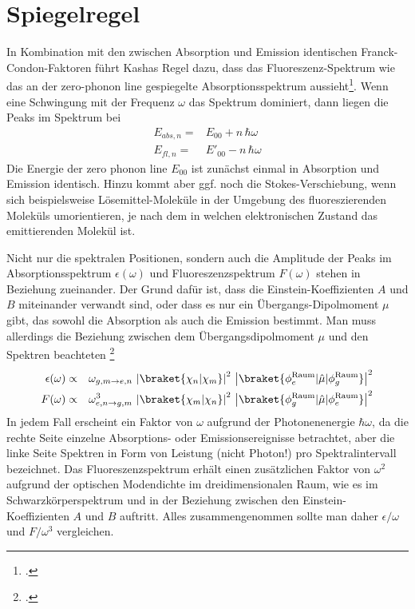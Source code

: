 \section{Spiegelregel}

In Kombination mit den zwischen Absorption und Emission identischen Franck-Condon-Faktoren führt  Kashas Regel dazu, dass das Fluoreszenz-Spektrum wie das an der zero-phonon line gespiegelte Absorptionsspektrum aussieht\footcite[Kapitel 1.3.2 und 1.3.3]{Lakowicz2010}. Wenn eine Schwingung mit der Frequenz $\omega$ das Spektrum dominiert, dann liegen die Peaks im Spektrum bei
\begin{align}
  E_{abs, n} = & E_{00} + n \, \hbar \omega \\
  E_{fl, n} = & E'_{00} - n \, \hbar \omega
\end{align}
Die Energie der zero phonon line $E_{00}$ ist zunächst einmal in Absorption und Emission identisch.  Hinzu kommt aber ggf. noch die Stokes-Verschiebung, wenn sich beispielsweise Lösemittel-Moleküle in der Umgebung des fluoreszierenden Moleküls umorientieren, je nach dem in welchen elektronischen Zustand das emittierenden Molekül ist.



Nicht nur die spektralen Positionen, sondern auch die Amplitude der Peaks im Absorptionsspektrum $\epsilon(\omega)$ und Fluoreszenzspektrum $F(\omega)$ stehen in Beziehung zueinander. Der Grund dafür ist, dass die Einstein-Koeffizienten $A$ und $B$ miteinander verwandt sind, oder dass es nur ein Übergangs-Dipolmoment $\mu$ gibt, das sowohl die Absorption als auch die Emission bestimmt. Man muss allerdings die Beziehung zwischen dem Übergangsdipolmoment $\mu$ und den Spektren beachteten \footcite[Kapitel 5.2]{Parson}
\begin{eqnarray}
   \epsilon(\omega  )  & \propto & \omega_{g,m \rightarrow e,n}  \,  \left| \braket{\chi_n |  \chi_m} \right|^2 
\,  \left| \braket{\phi^\text{Raum}_e | \hat{\mu} | \phi^\text{Raum}_g} \right|^2 \\
   F(\omega ) & \propto & \omega_{e,n \rightarrow g,m}^3 \,  \left| \braket{\chi_m |  \chi_n} \right|^2 
\,  \left|\braket{\phi^\text{Raum}_g | \hat{\mu} | \phi^\text{Raum}_e} \right|^2
\end{eqnarray}
In jedem Fall erscheint ein Faktor von $\omega$ aufgrund der Photonenenergie $\hbar \omega$, da die rechte Seite einzelne Absorptions- oder Emissionsereignisse betrachtet, aber die linke Seite  Spektren in Form von Leistung (nicht Photon!) pro Spektralintervall bezeichnet. Das Fluoreszenzspektrum erhält einen zusätzlichen Faktor von $\omega^2$ aufgrund der optischen Modendichte im dreidimensionalen Raum, wie es im Schwarzkörperspektrum und in der  Beziehung zwischen den Einstein-Koeffizienten $A$ und $B$ auftritt.
Alles zusammengenommen sollte man daher $\epsilon / \omega$ und $F / \omega^3$ vergleichen.



